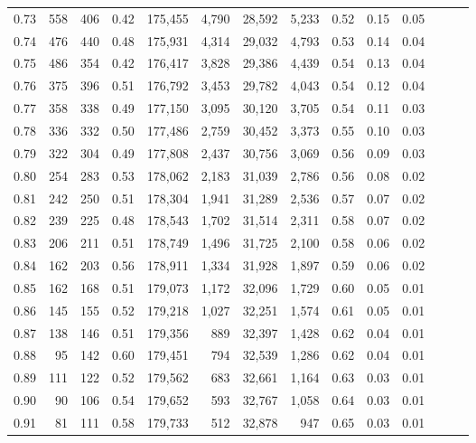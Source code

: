 \begin{tabular}{rrrrrrrrrrrrrr}
0.73 &    558 &  406 &  0.42 &  175,455 &    4,790 &  28,592 &   5,233 &  0.52 &  0.15 &      0.05 \\
0.74 &    476 &  440 &  0.48 &  175,931 &    4,314 &  29,032 &   4,793 &  0.53 &  0.14 &      0.04 \\
0.75 &    486 &  354 &  0.42 &  176,417 &    3,828 &  29,386 &   4,439 &  0.54 &  0.13 &      0.04 \\
0.76 &    375 &  396 &  0.51 &  176,792 &    3,453 &  29,782 &   4,043 &  0.54 &  0.12 &      0.04 \\
0.77 &    358 &  338 &  0.49 &  177,150 &    3,095 &  30,120 &   3,705 &  0.54 &  0.11 &      0.03 \\
0.78 &    336 &  332 &  0.50 &  177,486 &    2,759 &  30,452 &   3,373 &  0.55 &  0.10 &      0.03 \\
0.79 &    322 &  304 &  0.49 &  177,808 &    2,437 &  30,756 &   3,069 &  0.56 &  0.09 &      0.03 \\
0.80 &    254 &  283 &  0.53 &  178,062 &    2,183 &  31,039 &   2,786 &  0.56 &  0.08 &      0.02 \\
0.81 &    242 &  250 &  0.51 &  178,304 &    1,941 &  31,289 &   2,536 &  0.57 &  0.07 &      0.02 \\
0.82 &    239 &  225 &  0.48 &  178,543 &    1,702 &  31,514 &   2,311 &  0.58 &  0.07 &      0.02 \\
0.83 &    206 &  211 &  0.51 &  178,749 &    1,496 &  31,725 &   2,100 &  0.58 &  0.06 &      0.02 \\
0.84 &    162 &  203 &  0.56 &  178,911 &    1,334 &  31,928 &   1,897 &  0.59 &  0.06 &      0.02 \\
0.85 &    162 &  168 &  0.51 &  179,073 &    1,172 &  32,096 &   1,729 &  0.60 &  0.05 &      0.01 \\
0.86 &    145 &  155 &  0.52 &  179,218 &    1,027 &  32,251 &   1,574 &  0.61 &  0.05 &      0.01 \\
0.87 &    138 &  146 &  0.51 &  179,356 &      889 &  32,397 &   1,428 &  0.62 &  0.04 &      0.01 \\
0.88 &     95 &  142 &  0.60 &  179,451 &      794 &  32,539 &   1,286 &  0.62 &  0.04 &      0.01 \\
0.89 &    111 &  122 &  0.52 &  179,562 &      683 &  32,661 &   1,164 &  0.63 &  0.03 &      0.01 \\
0.90 &     90 &  106 &  0.54 &  179,652 &      593 &  32,767 &   1,058 &  0.64 &  0.03 &      0.01 \\
0.91 &     81 &  111 &  0.58 &  179,733 &      512 &  32,878 &     947 &  0.65 &  0.03 &      0.01 \\

\end{tabular}
